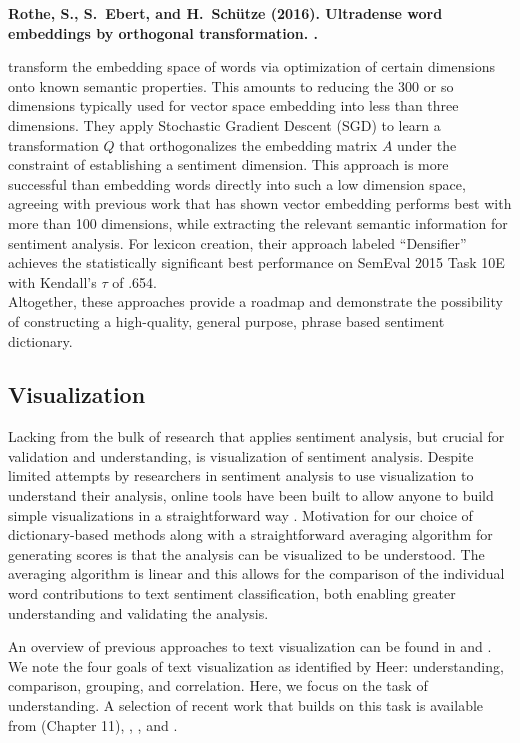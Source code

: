 {\noindent \textbf{Rothe, S., S.~Ebert, and H.~Sch{\"u}tze (2016).
\newblock Ultradense word embeddings by orthogonal transformation.
.}

\noindent \cite{rothe2016ultradense} transform the embedding space of words via optimization of certain dimensions onto known semantic properties.
This amounts to reducing the 300 or so dimensions typically used for vector space embedding into less than three dimensions.
They apply Stochastic Gradient Descent (SGD) to learn a transformation $Q$ that orthogonalizes the embedding matrix $A$ under the constraint of establishing a sentiment dimension.
This approach is more successful than embedding words directly into such a low dimension space, agreeing with previous work that has shown vector embedding performs best with more than 100 dimensions, while extracting the relevant semantic information for sentiment analysis.
For lexicon creation, their approach labeled ``Densifier'' achieves the statistically significant best performance on SemEval 2015 Task 10E with Kendall's $\tau$ of .654.\\

Altogether, these approaches provide a roadmap and demonstrate the possibility of constructing a high-quality, general purpose, phrase based sentiment dictionary.

\subsection{Visualization}
\label{subsec:vis}

Lacking from the bulk of research that applies sentiment analysis, but crucial for validation and understanding, is visualization of sentiment analysis.
Despite limited attempts by researchers in sentiment analysis to use visualization to understand their analysis, online tools have been built to allow anyone to build simple visualizations in a straightforward way \citep{viegas2007manyeyes}.
Motivation for our choice of dictionary-based methods along with a straightforward averaging algorithm for generating scores is that the analysis can be visualized to be understood.
The averaging algorithm is linear and this allows for the comparison of the individual word contributions to text sentiment classification, both enabling greater understanding and validating the analysis.

An overview of previous approaches to text visualization can be found in \cite{heer2014text} and \cite{cao2016introduction}. We note the four goals of text visualization as identified by Heer: understanding, comparison, grouping, and correlation.
Here, we focus on the task of understanding.
A selection of recent work that builds on this task is available from \cite{hearst2009search} (Chapter 11), \cite{chuang2012interpretation}, \cite{van2009mapping}, and \cite{chuang2012termite}.

}
